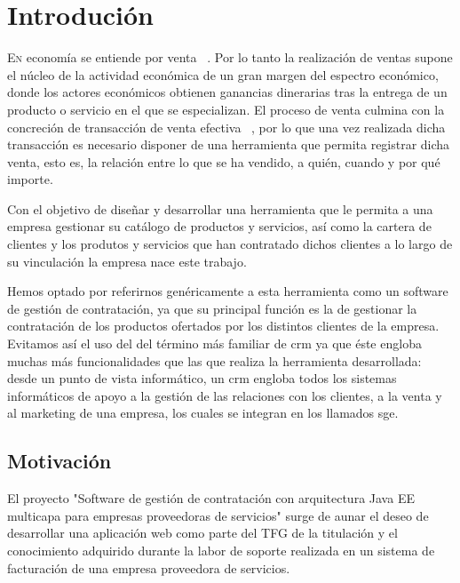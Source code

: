 \chapter{Introdución}
\label{chap:introducion}


\lettrine{E}{n} economía se entiende por venta ~\cite{ventas}. Por lo tanto la realización de ventas supone el núcleo de la actividad económica de un gran margen del espectro económico, donde los actores económicos obtienen ganancias dinerarias tras la entrega de un producto o servicio en el que se especializan. El proceso de venta culmina con la concreción de transacción de venta efectiva ~\cite{proceso-venta}, por lo que una vez realizada dicha transacción es necesario disponer de una herramienta que permita registrar dicha venta, esto es, la relación entre lo que se ha vendido, a quién, cuando y por qué importe.

Con el objetivo de diseñar y desarrollar una herramienta que le permita a una empresa gestionar su catálogo de productos y servicios, así como la cartera de clientes y los produtos y servicios que han contratado dichos clientes a lo largo de su vinculación la empresa nace este trabajo.

Hemos optado por referirnos genéricamente a esta herramienta como un software de gestión de contratación, ya que su principal función es la de gestionar la contratación de los productos ofertados por los distintos clientes de la empresa. Evitamos así el uso del del término más familiar de \acrfull{crm} ya que éste engloba muchas más funcionalidades que las que realiza la herramienta desarrollada: desde un punto de vista informático, un \acrshort{crm} engloba todos los sistemas informáticos de apoyo a la gestión de las relaciones con los clientes, a la venta y al marketing de una empresa, los cuales se integran en los llamados \acrfull{sge}.


\section{Motivación}
\label{sec:motivacion}

El proyecto "Software de gestión de contratación con arquitectura Java EE multicapa para empresas proveedoras de servicios" surge de aunar el deseo de desarrollar una aplicación web como parte del TFG de la titulación y el conocimiento adquirido durante la labor de soporte realizada en un sistema de facturación de una empresa proveedora de servicios.

